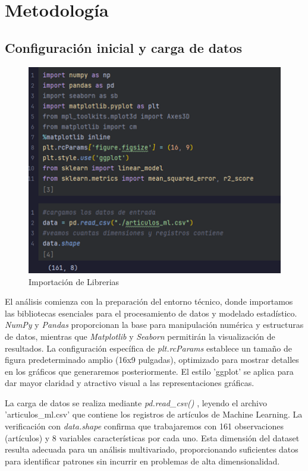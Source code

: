\documentclass[12pt, a4paper]{article}
\begin{document}
\newpage

\section{Metodología}

\subsection{Configuración inicial y carga de datos}

\begin{figure}[H]
    \centering
    \includegraphics[width=1.0\textwidth]{Actividad-10/Imagen1.png}
    \caption{Importación de Librerias}
\end{figure}

El análisis comienza con la preparación del entorno técnico, donde importamos las bibliotecas esenciales para el procesamiento de datos y modelado estadístico. \textit{NumPy} y \textit{Pandas} proporcionan la base para manipulación numérica y estructuras de datos, mientras que \textit{Matplotlib} y \textit{Seaborn} permitirán la visualización de resultados. La configuración específica de \textit{plt.rcParams} establece un tamaño de figura predeterminado amplio (16x9 pulgadas), optimizado para mostrar detalles en los gráficos que generaremos posteriormente. El estilo 'ggplot' se aplica para dar mayor claridad y atractivo visual a las representaciones gráficas.

La carga de datos se realiza mediante \textit{ pd.read\_csv() }, leyendo el archivo 'articulos\_ml.csv' que contiene los registros de artículos de Machine Learning. La verificación con \textit{data.shape} confirma que trabajaremos con 161 observaciones (artículos) y 8 variables características por cada uno. Esta dimensión del dataset resulta adecuada para un análisis multivariado, proporcionando suficientes datos para identificar patrones sin incurrir en problemas de alta dimensionalidad.
\end{document}
